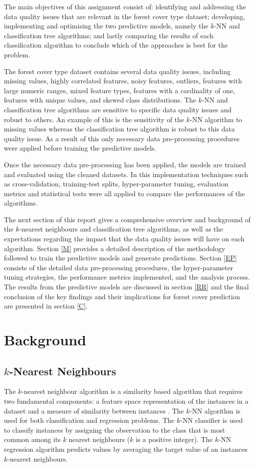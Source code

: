 \documentclass[conference]{IEEEtran}
\begin{document}
	The main objectives of this assignment consist of: identifying and addressing the data quality issues that are relevant in the forest cover type dataset; developing, implementing and optimising the two predictive models, namely the $k$-NN and classification tree algorithms; and lastly comparing the results of each classification algorithm to conclude which of the approaches is best for the problem.
	
	The forest cover type dataset contains several data quality issues, including missing values, highly correlated features, noisy features, outliers, features with large numeric ranges, mixed feature types, features with a cardinality of one, features with unique values, and skewed class distributions. The $k$-NN and classification tree algorithms are sensitive to specific data quality issues and robust to others. An example of this is the sensitivity of the $k$-NN algorithm to missing values whereas the classification tree algorithm is robust to this data quality issue. As a result of this only necessary data pre-processing procedures were applied before training the predictive models. 
	
	Once the necessary data pre-processing has been applied, the models are trained and evaluated using the cleaned datasets. In this implementation techniques such as cross-validation, training-test splits, hyper-parameter tuning, evaluation metrics and statistical tests were all applied to compare the performances of the algorithms. 
	
	The next section of this report gives a comprehensive overview and background of the $k$-nearest neighbours and classification tree algorithms, as well as the expectations regarding the impact that the data quality issues will have on each algorithm. Section \ref{M} provides a detailed description of the methodology followed to train the predictive models and generate predictions. Section \ref{EP} consists of the detailed data pre-processing procedures, the hyper-parameter tuning strategies, the performance metrics implemented, and the analysis process. The results from the predictive models are discussed in section \ref{RR} and the final conclusion of the key findings and their implications for forest cover prediction are presented in section \ref{C}.
	
	\section{Background}\label{B}
	\subsection{$k$-Nearest Neighbours}
	The $k$-nearest neighbour algorithm is a similarity based algorithm that requires two fundamental components: a feature space representation of the instances in a dataset and a measure of similarity between instances \cite{b1}. The $k$-NN algorithm is used for both classification and regression problems. The $k$-NN classifier is used to classify instances by assigning the observation to the class that is most common among its $k$ nearest neighbours ($k$ is a positive integer). The $k$-NN regression algorithm predicts values by averaging the target value of an instances $k$-nearest neighbours.
	
\end{document}
